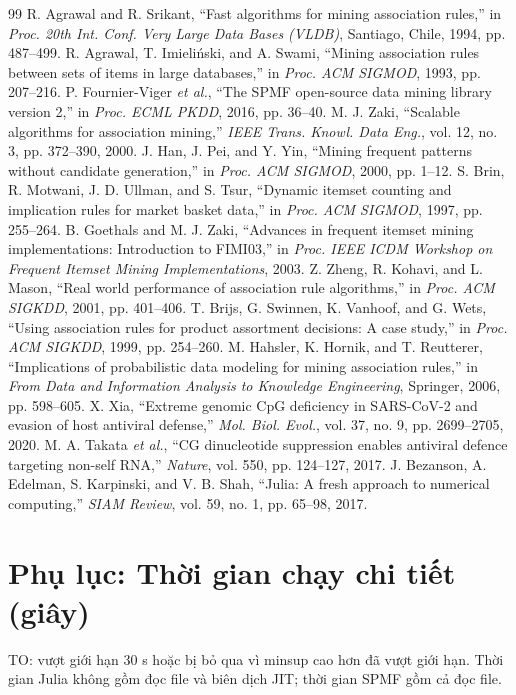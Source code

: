 \documentclass[10pt,twocolumn,letterpaper]{article}
\begin{document}
\begin{thebibliography}{99}
\footnotesize
{} R. Agrawal and R. Srikant, ``Fast algorithms for mining association rules,'' in \textit{Proc. 20th Int. Conf. Very Large Data Bases (VLDB)}, Santiago, Chile, 1994, pp. 487--499.
 R. Agrawal, T. Imieliński, and A. Swami, ``Mining association rules between sets of items in large databases,'' in \textit{Proc. ACM SIGMOD}, 1993, pp. 207--216.
 P. Fournier-Viger \textit{et al.}, ``The SPMF open-source data mining library version 2,'' in \textit{Proc. ECML PKDD}, 2016, pp. 36--40.
 M. J. Zaki, ``Scalable algorithms for association mining,'' \textit{IEEE Trans. Knowl. Data Eng.}, vol. 12, no. 3, pp. 372--390, 2000.
 J. Han, J. Pei, and Y. Yin, ``Mining frequent patterns without candidate generation,'' in \textit{Proc. ACM SIGMOD}, 2000, pp. 1--12.
 S. Brin, R. Motwani, J. D. Ullman, and S. Tsur, ``Dynamic itemset counting and implication rules for market basket data,'' in \textit{Proc. ACM SIGMOD}, 1997, pp. 255--264.
 B. Goethals and M. J. Zaki, ``Advances in frequent itemset mining implementations: Introduction to FIMI03,'' in \textit{Proc. IEEE ICDM Workshop on Frequent Itemset Mining Implementations}, 2003.
 Z. Zheng, R. Kohavi, and L. Mason, ``Real world performance of association rule algorithms,'' in \textit{Proc. ACM SIGKDD}, 2001, pp. 401--406.
 T. Brijs, G. Swinnen, K. Vanhoof, and G. Wets, ``Using association rules for product assortment decisions: A case study,'' in \textit{Proc. ACM SIGKDD}, 1999, pp. 254--260.
 M. Hahsler, K. Hornik, and T. Reutterer, ``Implications of probabilistic data modeling for mining association rules,'' in \textit{From Data and Information Analysis to Knowledge Engineering}, Springer, 2006, pp. 598--605.
 X. Xia, ``Extreme genomic CpG deficiency in SARS-CoV-2 and evasion of host antiviral defense,'' \textit{Mol. Biol. Evol.}, vol. 37, no. 9, pp. 2699--2705, 2020.
 M. A. Takata \textit{et al.}, ``CG dinucleotide suppression enables antiviral defence targeting non-self RNA,'' \textit{Nature}, vol. 550, pp. 124--127, 2017.
 J. Bezanson, A. Edelman, S. Karpinski, and V. B. Shah, ``Julia: A fresh approach to numerical computing,'' \textit{SIAM Review}, vol. 59, no. 1, pp. 65--98, 2017.
\end{thebibliography}

\onecolumn
\appendix
\section*{Phụ lục: Thời gian chạy chi tiết (giây)}
TO: vượt giới hạn 30 s hoặc bị bỏ qua vì minsup cao hơn đã vượt giới hạn. Thời gian Julia không gồm đọc file và biên dịch JIT; thời gian SPMF gồm cả đọc file.
\begin{center}
\small

\end{center}
\end{document}
